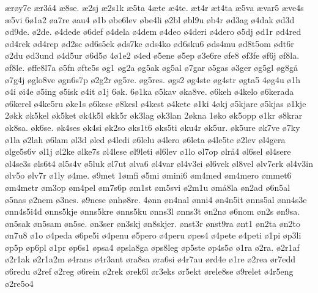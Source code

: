^^e6r^^f8y7e
^^e6r3^^e54
^^e68se.
^^e62sj
^^e62s1k
^^e65ta
4^^e6te
^^e64te.
^^e6t4r
^^e6t4ta
^^e65va
^^e6var5
^^e6ve4s
^^e65vi
6^^f81a2
^^f8a7re
^^f8au4
^^f81b
^^f8be6lev
^^f8be4li
^^f82bl
^^f8bl9u
^^f8b4r
^^f8d3ag
^^f84dak
^^f8d3d
^^f8d9de.
^^f82de.
^^f84dede
^^f86def
^^f84dela
^^f84dem
^^f84deo
^^f84deri
^^f84dero
^^f85dj
^^f8d1r
^^f8d4red
^^f8d4rek
^^f8d4rep
^^f8d2sc
^^f8d6s5ek
^^f8ds7ke
^^f8ds4ko
^^f8d6sku6
^^f8ds4mu
^^f8d8t5om
^^f8dt6r
^^f82du
^^f8d3und
^^f84d5ur
^^f86d5^^f8
4^^f81e2
^^f84ed
^^f85ene
^^f85ep
^^f83e6re
^^f8fe8
^^f8f3fe
^^f8f6j
^^f8f8la.
^^f8f8le.
^^f8ffe8l7a
^^f85fn
^^f8fte5s
^^f8g1
^^f8g2a
^^f8g5ak
^^f8g5al
^^f87gar
^^f85gas
^^f83ger
^^f8g5gl
^^f8g8g^^e5
^^f87g4j
^^f8glo8ve
^^f8gn6s7p
^^f82g2r
^^f8g5re.
^^f8g5res.
^^f8gs2
^^f8g4ste
^^f8g4str
^^f8gta5
4^^f8g4u
^^f81h
^^f84i
^^f8i4e
^^f85ing
^^f85isk
^^f84it
^^f81j
6^^f8k.
6^^f81ka
^^f85kav
^^f8ka8ve.
^^f86keh
^^f84kelo
^^f86kerada
^^f86kerel
^^f84ke5ru
^^f8ke1s
^^f86kese
^^f88kesl
^^f84kest
^^f84kete
^^f81ki
4^^f8kj
^^f85kjare
^^f85kjas
^^f81kje
2^^f8kk
^^f8k5kel
^^f8k5ket
^^f8k4k5l
^^f8kk5r
^^f8k3lag
^^f8k3lan
2^^f8kna
1^^f8ko
^^f8k5opp
^^f81kr
^^f88krar
^^f8k8sa.
^^f8k6se.
^^f8k4ses
^^f8k4si
^^f8k2so
^^f8ks1t6
^^f8ks5ti
^^f8ku4r
^^f8k5ur.
^^f8k5ure
^^f8k7ve
^^f87ky
^^f81la
^^f82lah
^^f86lam
^^f8l3d
^^f8led
^^f84ledi
^^f86lelu
^^f84lero
^^f86leta
^^f84le5te
^^f82lev
^^f8l4gera
^^f8lge5s6v
^^f8l1j
^^f8l2ke
^^f8lke7s
^^f8l4lese
^^f8l9leti
^^f8l6lev
^^f81lo
^^f8l7op
^^f8lr^^e54
^^f8l6sel
^^f8l4sere
^^f8l4se3s
^^f8ls6t4
^^f8l5s4v
^^f85luk
^^f8l7ut
^^f8lva6
^^f8l4var
^^f8l4v3ei
^^f8l6vek
^^f8l8vel
^^f8lv7erk
^^f8l4v3in
^^f8lv5o
^^f8lv7r
^^f81ly
^^f84me.
^^f89met
1^^f8mfi
^^f85mi
^^f8mini6
^^f8m4med
^^f8m4mero
^^f8mmet6
^^f8m4metr
^^f8m3op
^^f8m4pel
^^f8m7s6p
^^f8m1st
^^f8m5svi
^^f82m1u
^^f8m^^e58la
^^f8n2ad
^^f86n5al
^^f85nas
^^f82nem
^^f83nes.
^^f89nese
^^f8nh^^f88re.
4^^f8nn
^^f8n4nal
^^f8nni4
^^f8n4n5it
^^f8nns5al
^^f8nn4s3e
^^f8nn4s5i4d
^^f8nns5kje
^^f8nns5kre
^^f8nns5ku
^^f8nns3l
^^f8nns3t
^^f8n2n^^f8
^^f86nom
^^f8n2s
^^f8n9sa.
^^f8n5sak
^^f8n5sam
^^f8n5se.
^^f8n3ser
^^f8n3skj
^^f8n8skjer.
^^f8nst3r
^^f8nst9ra
^^f8nt1
^^f8n2ta
^^f8n2to
^^f8n7u8
^^f81o
^^f84peda
^^f86pe5i
^^f84penu
^^f85pero
^^f84peru
^^f8pes4
^^f84pete
^^f84peti
^^f81pi
^^f8p3li
^^f8p5p
^^f8p6pl
^^f81pr
^^f8p6s1
^^f8psa4
^^f8psla8ga
^^f8ps8leg
^^f8p5ste
^^f8p4s5^^f8
^^f81ra
^^f82ra.
^^f82r1af
^^f82r1ak
^^f82r1a2m
^^f84rans
^^f84r3ant
^^f8ra8sa
^^f8ra6si
^^f84r7au
^^f8rd4e
^^f81re
^^f82rea
^^f8r7edd
^^f86redu
^^f82ref
^^f82reg
^^f86rein
^^f82rek
^^f8rek6l
^^f8r3eks
^^f8r5ekt
^^f8rele8se
^^f89relet
^^f84r5eng
^^f82re5o4
